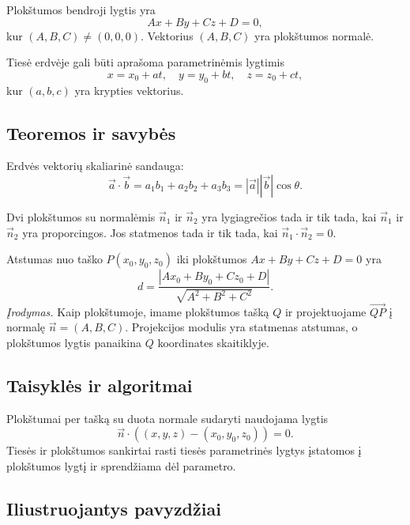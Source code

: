 \begin{apibreztis}
Plokštumos bendroji lygtis yra
\[
Ax+By+Cz+D=0,
\]
kur $(A,B,C)\ne(0,0,0)$. Vektorius $(A,B,C)$ yra plokštumos normalė.
\end{apibreztis}

\begin{apibreztis}
Tiesė erdvėje gali būti aprašoma parametrinėmis lygtimis
\[
x=x_0+at,\quad y=y_0+bt,\quad z=z_0+ct,
\]
kur $(a,b,c)$ yra krypties vektorius.
\end{apibreztis}

\subsection{Teoremos ir savybės}

\begin{savybe}
Erdvės vektorių skaliarinė sandauga:
\[
\vec a\cdot\vec b=a_1b_1+a_2b_2+a_3b_3=|\vec a||\vec b|\cos\theta.
\]
\end{savybe}

\begin{savybe}
Dvi plokštumos su normalėmis $\vec n_1$ ir $\vec n_2$ yra lygiagrečios tada ir tik tada, kai $\vec n_1$ ir $\vec n_2$ yra proporcingos. Jos statmenos tada ir tik tada, kai $\vec n_1\cdot\vec n_2=0$.
\end{savybe}

\begin{teorema}
Atstumas nuo taško $P(x_0,y_0,z_0)$ iki plokštumos $Ax+By+Cz+D=0$ yra
\[
d=\frac{|Ax_0+By_0+Cz_0+D|}{\sqrt{A^2+B^2+C^2}}.
\]
\emph{Įrodymas.} Kaip plokštumoje, imame plokštumos tašką $Q$ ir projektuojame $\overrightarrow{QP}$ į normalę $\vec n=(A,B,C)$. Projekcijos modulis yra statmenas atstumas, o plokštumos lygtis panaikina $Q$ koordinates skaitiklyje.
\end{teorema}

\subsection{Taisyklės ir algoritmai}

Plokštumai per tašką su duota normale sudaryti naudojama lygtis
\[
\vec n\cdot((x,y,z)-(x_0,y_0,z_0))=0.
\]
Tiesės ir plokštumos sankirtai rasti tiesės parametrinės lygtys įstatomos į plokštumos lygtį ir sprendžiama dėl parametro.

\subsection{Iliustruojantys pavyzdžiai}

